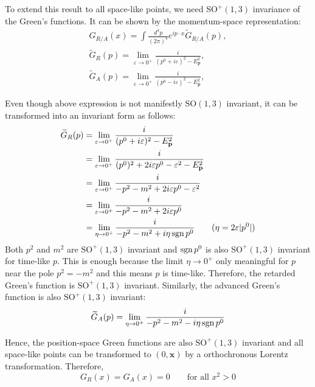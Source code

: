 \documentclass[a4paper,11pt]{article}
\begin{document}
To extend this result to all space-like points, we need $\mathrm{SO}^+(1, 3)$ invariance of the Green's functions. It can be shown by the momentum-space representation:
\begin{gather}
    G_{R/A}(x) = \int \frac{d^4p}{(2\pi)^4} e^{ip\cdot x} \tilde{G}_{R/A}(p),\\ 
    \widetilde{G}_{R}(p)=\lim_{\varepsilon\to 0^+}\frac{i}{(p^0 + i\varepsilon)^2-
    E_{\mathbf{p}}^2},\\
    \widetilde{G}_{A}(p)=\lim_{\varepsilon\to 0^+}\frac{i}{(p^0 - i\varepsilon)^2-
    E_{\mathbf{p}}^2},
\end{gather}

Even though above expression is not manifestly $\mathrm{SO}(1, 3)$ invariant, it can be transformed into an invariant form as follows:
\begin{align}
    \widetilde{G}_{R}(p)&=\lim_{\varepsilon\to 0^+}\frac{i}{(p^0 + i\varepsilon)^2-
    E_{\mathbf{p}}^2}\\
    &=\lim_{\varepsilon\to 0^+}\frac{i}{(p^0)^2 + 2i\varepsilon p^0 - \varepsilon^2-
    E_{\mathbf{p}}^2}\\
    &=\lim_{\varepsilon\to 0^+}\frac{i}{-p^2 - m^2 + 2i\varepsilon p^0 - \varepsilon^2}\\
    &=\lim_{\varepsilon\to 0^+}\frac{i}{-p^2 - m^2 + 2i\varepsilon p^0}\\
    &=\lim_{\eta\to 0^+}\frac{i}{-p^2 - m^2 + i\eta \operatorname{sgn} p^0} \qquad (\eta = 2\varepsilon|p^0|)
\end{align}
Both $p^2$ and $m^2$ are $\mathrm{SO}^+(1, 3)$ invariant and $\operatorname{sgn} p^0$ is also $\mathrm{SO}^+(1, 3)$ invariant for time-like $p$. This is enough because the limit $\eta\to 0^+$ only meaningful for $p$ near the pole $p^2=-m^2$ and this means $p$ is time-like. Therefore, the retarded Green's function is $\mathrm{SO}^+(1, 3)$ invariant. Similarly, the advanced Green's function is also $\mathrm{SO}^+(1, 3)$ invariant:
\begin{equation}
    \widetilde{G}_{A}(p)
    =\lim_{\eta\to 0^+}\frac{i}{-p^2 - m^2 - i\eta \operatorname{sgn} p^0}
\end{equation}

Hence, the position-space Green functions are also $\mathrm{SO}^+(1, 3)$ invariant and all space-like points can be transformed to $(0, \mathbf{x})$ by a orthochronous Lorentz transformation. Therefore,
\begin{equation}
    G_R(x) = G_A(x) = 0 \qquad \text{for all } x^2 > 0
\end{equation}
\end{document}
